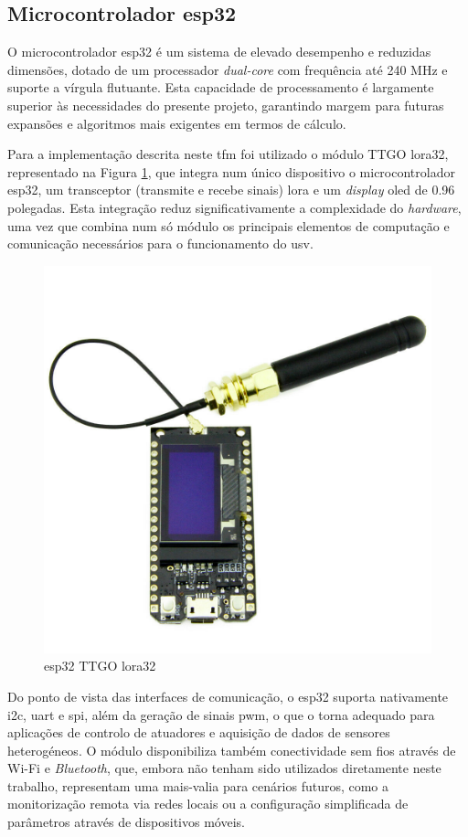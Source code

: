 \subsection{Microcontrolador \acrfull{esp32}}
\label{subsec:esp32}

O microcontrolador \acrfull{esp32} é um sistema de elevado desempenho e reduzidas dimensões, dotado de um processador \emph{dual-core} com frequência até 240 MHz e suporte a vírgula flutuante. Esta capacidade de processamento é largamente superior às necessidades do presente projeto, garantindo margem para futuras expansões e algoritmos mais exigentes em termos de cálculo.  

Para a implementação descrita neste \gls{tfm} foi utilizado o módulo TTGO \gls{lora}32, representado na Figura \ref{fig:lora32}, que integra num único dispositivo o microcontrolador \gls{esp32}, um transceptor (transmite e recebe sinais) \gls{lora} e um \emph{display} \gls{oled} de 0.96 polegadas. Esta integração reduz significativamente a complexidade do \emph{hardware}, uma vez que combina num só módulo os principais elementos de computação e comunicação necessários para o funcionamento do \gls{usv}.  

\begin{figure}[H]
    \centering
    \includegraphics[width=0.33\linewidth]{figuras/lora32.png}
    \caption{\gls{esp32} TTGO \gls{lora}32}
    \label{fig:lora32}
\end{figure}

Do ponto de vista das interfaces de comunicação, o \gls{esp32} suporta nativamente \gls{i2c}, \gls{uart} e \gls{spi}, além da geração de sinais \gls{pwm}, o que o torna adequado para aplicações de controlo de atuadores e aquisição de dados de sensores heterogéneos. O módulo disponibiliza também conectividade sem fios através de Wi-Fi e \emph{Bluetooth}, que, embora não tenham sido utilizados diretamente neste trabalho, representam uma mais-valia para cenários futuros, como a monitorização remota via redes locais ou a configuração simplificada de parâmetros através de dispositivos móveis.  

